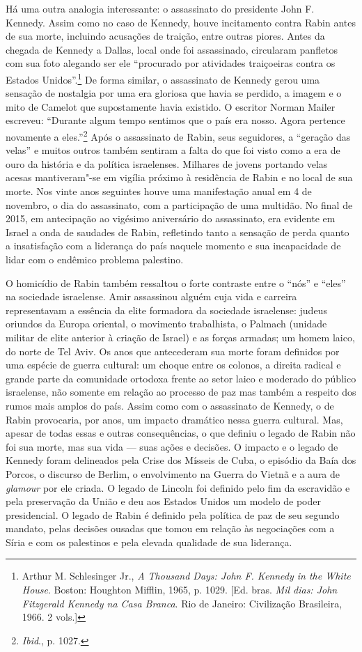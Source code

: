 Há uma outra analogia interessante: o assassinato do presidente John F.
Kennedy. Assim como no caso de Kennedy, houve incitamento contra Rabin
antes de sua morte, incluindo acusações de traição, entre outras
piores. Antes da chegada de Kennedy a Dallas, local onde foi
assassinado, circularam panfletos com sua foto alegando ser ele
``procurado por atividades traiçoeiras contra os Estados
Unidos''.\footnote{Arthur M. Schlesinger Jr., \emph{A Thousand Days: John F. Kennedy in the
White House}. Boston: Houghton Mifflin, 1965, p. 1029. {[}Ed. bras. \emph{Mil dias: John Fitzgerald Kennedy na Casa Branca}. Rio de Janeiro: Civilização Brasileira, 
1966. 2 vols.{]}} De forma similar, o assassinato de Kennedy gerou
uma sensação de nostalgia por uma era gloriosa que havia se perdido, a
imagem e o mito de Camelot que supostamente havia existido. O escritor
Norman Mailer escreveu: ``Durante algum tempo sentimos que o país era
nosso. Agora pertence novamente a eles.''\footnote{\emph{Ibid}., p. 1027.} Após o assassinato
de Rabin, seus seguidores, a ``geração das velas'' e muitos outros também
sentiram a falta do que foi visto como a era de ouro da história e da
política israelenses. Milhares de jovens portando velas acesas
mantiveram"-se em vigília próximo à residência de Rabin e no local de sua
morte. Nos vinte anos seguintes houve uma manifestação anual em 4
de novembro, o dia do assassinato, com a participação de uma multidão.
No final de 2015, em antecipação ao vigésimo aniversário do assassinato,
era evidente em Israel a onda de saudades de Rabin, refletindo tanto a
sensação de perda quanto a insatisfação com a liderança do país naquele
momento e sua incapacidade de lidar com o endêmico problema palestino.

O homicídio de Rabin também ressaltou o forte contraste entre o
``nós'' e ``eles'' na sociedade israelense. Amir assassinou alguém cuja
vida e carreira representavam a essência da elite formadora da sociedade
israelense: judeus oriundos da Europa oriental, o movimento trabalhista,
o Palmach (unidade militar de elite anterior à criação de Israel) e as
forças armadas; um homem laico, do norte de Tel Aviv. Os anos que
antecederam sua morte foram definidos por uma espécie de guerra
cultural: um choque entre os colonos, a direita radical e grande parte
da comunidade ortodoxa frente ao setor laico e moderado do público
israelense, não somente em relação ao processo de paz mas também a respeito
dos rumos mais amplos do país. Assim como com o assassinato de Kennedy,
o de Rabin provocaria, por anos, um impacto dramático nessa guerra
cultural. Mas, apesar de todas essas e outras consequências,
o que definiu o legado de Rabin não foi sua morte, mas sua vida --- suas ações e decisões. 
O impacto e o legado de Kennedy foram delineados pela Crise
dos Mísseis de Cuba, o episódio da Baía dos Porcos, o discurso de
Berlim, o envolvimento na Guerra do Vietnã e a aura de \emph{glamour}
por ele criada. O legado de Lincoln foi definido pelo fim da escravidão
e pela preservação da União e deu aos Estados Unidos um modelo de poder
presidencial. O legado de Rabin é definido pela política de paz de seu
segundo mandato, pelas decisões ousadas que tomou em relação às negociações
com a Síria e com os palestinos e pela elevada qualidade de sua liderança.

